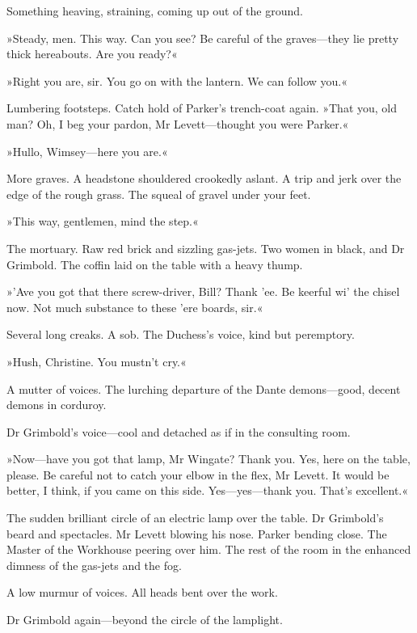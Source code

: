 Something heaving, straining, coming up out of the ground.

»Steady, men. This way. Can you see? Be careful of the graves\allowbreak---\allowbreak they lie pretty thick hereabouts. Are you ready?«

»Right you are, sir. You go on with the lantern. We can follow you.«

Lumbering footsteps. Catch hold of Parker's trench-coat again. »That you, old man? Oh, I beg your pardon, Mr Levett\allowbreak---\allowbreak thought you were Parker.«

»Hullo, Wimsey\allowbreak---\allowbreak here you are.«

More graves. A headstone shouldered crookedly aslant. A trip and jerk over the edge of the rough grass. The squeal of gravel under your feet.

»This way, gentlemen, mind the step.«

The mortuary. Raw red brick and sizzling gas-jets. Two women in black, and Dr Grimbold. The coffin laid on the table with a heavy thump.

»'Ave you got that there screw-driver, Bill? Thank 'ee. Be keerful wi' the chisel now. Not much substance to these 'ere boards, sir.«

Several long creaks. A sob. The Duchess's voice, kind but peremptory.

»Hush, Christine. You mustn't cry.«

A mutter of voices. The lurching departure of the Dante demons\allowbreak---\allowbreak good, decent demons in corduroy.

Dr Grimbold's voice\allowbreak---\allowbreak cool and detached as if in the consulting room.

»Now\allowbreak---\allowbreak have you got that lamp, Mr Wingate? Thank you. Yes, here on the table, please. Be careful not to catch your elbow in the flex, Mr Levett. It would be better, I think, if you came on this side. Yes\allowbreak---\allowbreak yes---thank you. That's excellent.«

The sudden brilliant circle of an electric lamp over the table. Dr Grimbold's beard and spectacles. Mr Levett blowing his nose. Parker bending close. The Master of the Workhouse peering over him. The rest of the room in the enhanced dimness of the gas-jets and the fog.

A low murmur of voices. All heads bent over the work.

Dr Grimbold again\allowbreak---\allowbreak beyond the circle of the lamplight.

